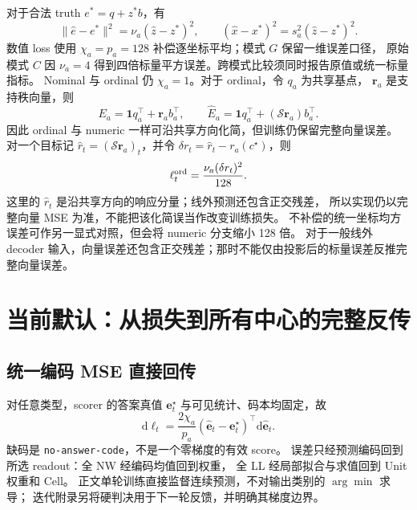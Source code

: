 \documentclass[11pt,UTF8,fontset=fandol]{ctexart}
\numberwithin{equation}{section}
\theoremstyle{definition}
\begin{document}
对于合法 truth $e^*=q+z^*b$，有
\begin{equation}
 \|\widehat e-e^*\|^2=\nu_a(\widehat z-z^*)^2,
 \qquad (\widehat x-x^*)^2=s_a^2(\widehat z-z^*)^2.
 \label{v51:eq:value-loss-isometry}
\end{equation}
数值 loss 使用 $\chi_a=p_a=128$ 补偿逐坐标平均；模式 $G$ 保留一维误差口径，
原始模式 $C$ 因 $\nu_a=4$ 得到四倍标量平方误差。跨模式比较须同时报告原值或统一标量指标。
Nominal 与 ordinal 仍 $\chi_a=1$。对于 ordinal，令 $q_a$ 为共享基点，
$\bm r_a$ 是支持秩向量，则
\begin{equation}
 E_a=\bm1 q_a^\top+\bm r_a b_a^\top,\qquad
 \widehat E_a=\bm1 q_a^\top+(\mathcal S\bm r_a)b_a^\top.
 \label{v53:eq:ordinal-identity-readout}
\end{equation}
因此 ordinal 与 numeric 一样可沿共享方向化简，但训练仍保留完整向量误差。
对一个目标记 $\widehat r_t=(\mathcal S\bm r_a)_t$，并令
$\delta r_t=\widehat r_t-r_a(c^\star)$，则
\begin{equation}
 \ell_t^{\rm ord}=\frac{\nu_a(\delta r_t)^2}{128}.
 \label{v53:eq:ordinal-identity-loss}
\end{equation}
这里的 $\widehat r_t$ 是沿共享方向的响应分量；线外预测还包含正交残差，
所以实现仍以完整向量 MSE 为准，不能把该化简误当作改变训练损失。
不补偿的统一坐标均方误差可作另一显式对照，但会将 numeric 分支缩小 128 倍。
对于一般线外 decoder 输入，向量误差还包含正交残差；那时不能仅由投影后的标量误差反推完整向量误差。


\section{当前默认：从损失到所有中心的完整反传}
\label{v51:app:gradient}
\subsection{统一编码 MSE 直接回传}
对任意类型，scorer 的答案真值 $\bm e_t^\star$ 与可见统计、码本均固定，故
\begin{equation}
 \mathrm d\ell_t=\frac{2\chi_a}{p_a}
 (\widehat{\bm e}_t-\bm e_t^\star)^\top\mathrm d\widehat{\bm e}_t.
 \label{eq:T:encoding-mse-gradient}
\end{equation}
缺码是 \texttt{no-answer-code}，不是一个零梯度的有效 score。
误差只经预测编码回到所选 readout：全 NW 经编码均值回到权重，
全 LL 经局部拟合与求值回到 Unit 权重和 Cell。
正文单轮训练直接监督连续预测，不对输出类别的 $\arg\min$ 求导；
迭代附录另将硬判决用于下一轮反馈，并明确其梯度边界。
\end{document}
